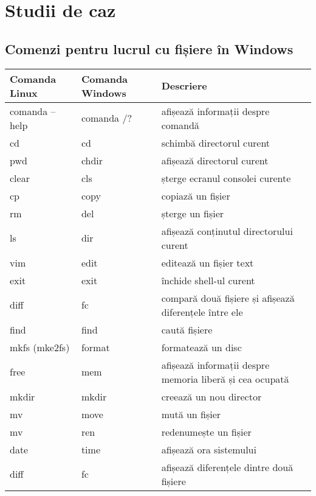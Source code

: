 \section{Studii de caz}

\subsection{Comenzi pentru lucrul cu fișiere în Windows}

\begin{table}[htb]
\begin{center}
	\begin{tabular}{ | p{} | p{} |  p{} | }
	\hline
		\textbf{Comanda Linux} & \textbf{Comanda Windows} & \textbf{Descriere} \\
	\hline
		comanda --help & comanda /? & afișează informații despre comandă \\
	\hline
		cd & cd & schimbă directorul curent \\
	\hline
		pwd & chdir & afișează directorul curent \\
	\hline
		clear & cls & șterge ecranul consolei curente \\
	\hline
		cp & copy & copiază un fișier \\
	\hline
		rm & del & șterge un fișier \\
	\hline
		ls & dir & afișează conținutul directorului curent \\
	\hline
		vim & edit & editează un fișier text \\
	\hline
		exit & exit & închide shell-ul curent \\
	\hline
		diff & fc & compară două fișiere și afișează diferențele între ele \\
	\hline
		find & find & caută fișiere \\
	\hline
		mkfs (mke2fs) & format & formatează un disc \\
	\hline
		free & mem & afișează informații despre memoria liberă și cea ocupată \\
	\hline
		mkdir & mkdir & creează un nou director \\
	\hline
		mv & move & mută un fișier \\
	\hline
		mv & ren & redenumește un fișier \\
	\hline
		date & time & afișează ora sistemului \\
	\hline
		diff & fc & afișează diferențele dintre două fișiere \\
	\hline
	\end{tabular}
	\label{table:fs-studiu-caz}
\end{center}
\end{table}
